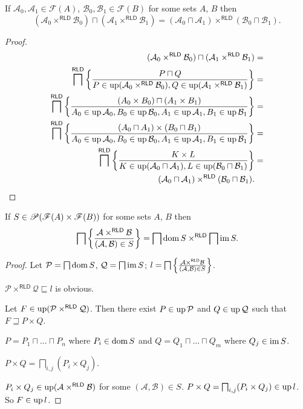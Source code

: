 \begin{thm}
If $\mathcal{A}_{0},\mathcal{A}_{1}\in\mathscr{F}(A)$, $\mathcal{B}_{0},\mathcal{B}_{1}\in\mathscr{F}(B)$
for some sets $A$, $B$ then
\[
\ensuremath{(\mathcal{A}_{0}\times^{\mathsf{RLD}}\mathcal{B}_{0})\sqcap(\mathcal{A}_{1}\times^{\mathsf{RLD}}\mathcal{B}_{1})=(\mathcal{A}_{0}\sqcap\mathcal{A}_{1})\times^{\mathsf{RLD}}(\mathcal{B}_{0}\sqcap\mathcal{B}_{1}).}
\]
\end{thm}
\begin{proof}
~
\begin{align*}
(\mathcal{A}_{0}\times^{\mathsf{RLD}}\mathcal{B}_{0})\sqcap(\mathcal{A}_{1}\times^{\mathsf{RLD}}\mathcal{B}_{1}) & =\\
\bigsqcap^{\mathsf{RLD}}\left\{ \frac{P\sqcap Q}{P\in\operatorname{up}(\mathcal{A}_{0}\times^{\mathsf{RLD}}\mathcal{B}_{0}),Q\in\operatorname{up}(\mathcal{A}_{1}\times^{\mathsf{RLD}}\mathcal{B}_{1})}\right\} & =\\
\bigsqcap^{\mathsf{RLD}}\left\{ \frac{(A_{0}\times B_{0})\sqcap(A_{1}\times B_{1})}{A_{0}\in\operatorname{up}\mathcal{A}_{0},B_{0}\in\operatorname{up}\mathcal{B}_{0},A_{1}\in\operatorname{up}\mathcal{A}_{1},B_{1}\in\operatorname{up}\mathcal{B}_{1}}\right\} & =\\
\bigsqcap^{\mathsf{RLD}}\left\{ \frac{(A_{0}\sqcap A_{1})\times(B_{0}\sqcap B_{1})}{A_{0}\in\operatorname{up}\mathcal{A}_{0},B_{0}\in\operatorname{up}\mathcal{B}_{0},A_{1}\in\operatorname{up}\mathcal{A}_{1},B_{1}\in\operatorname{up}\mathcal{B}_{1}}\right\} & =\\
\bigsqcap^{\mathsf{RLD}}\left\{ \frac{K\times L}{K\in\operatorname{up}(\mathcal{A}_{0}\sqcap\mathcal{A}_{1}),L\in\operatorname{up}(\mathcal{B}_{0}\sqcap\mathcal{B}_{1})}\right\} & =\\
(\mathcal{A}_{0}\sqcap\mathcal{A}_{1})\times^{\mathsf{RLD}}(\mathcal{B}_{0}\sqcap\mathcal{B}_{1}).
\end{align*}
\end{proof}
\begin{thm}
\label{meet-rld-prod}If $S\in\mathscr{P}(\mathscr{F}(A)\times\mathscr{F}(B))$
for some sets $A$, $B$ then
\[
\bigsqcap\left\{ \frac{\mathcal{A}\times^{\mathsf{RLD}}\mathcal{B}}{(\mathcal{A},\mathcal{B})\in S}\right\}=\bigsqcap\operatorname{dom} S\times^{\mathsf{RLD}}\bigsqcap\operatorname{im} S.
\]
\end{thm}
\begin{proof}
Let $\mathcal{P}=\bigsqcap\operatorname{dom} S$, $\mathcal{Q}=\bigsqcap\operatorname{im} S$;
$l=\bigsqcap\left\{ \frac{\mathcal{A}\times^{\mathsf{RLD}}\mathcal{B}}{(\mathcal{A},\mathcal{B})\in S}\right\}$.

$\mathcal{P}\times^{\mathsf{RLD}}\mathcal{Q}\sqsubseteq l$ is obvious.

Let $F\in\operatorname{up}(\mathcal{P}\times^{\mathsf{RLD}}\mathcal{Q})$. Then
there exist $P\in\operatorname{up}\mathcal{P}$ and $Q\in\operatorname{up}\mathcal{Q}$ such that
$F\sqsupseteq P\times Q$.

$P=P_{1}\sqcap\dots\sqcap P_{n}$ where $P_{i}\in\operatorname{dom} S$ and $Q=Q_{1}\sqcap\dots\sqcap Q_{m}$
where $Q_{j}\in\operatorname{im} S$.

$P\times Q=\bigsqcap_{i,j}(P_{i}\times Q_{j})$.

$P_{i}\times Q_{j}\in\operatorname{up}(\mathcal{A}\times^{\mathsf{RLD}}\mathcal{B})$
for some $(\mathcal{A},\mathcal{B})\in S$. $P\times Q=\bigsqcap_{i,j}(P_{i}\times Q_{j})\in\operatorname{up} l$.
So $F\in\operatorname{up} l$.\end{proof}
